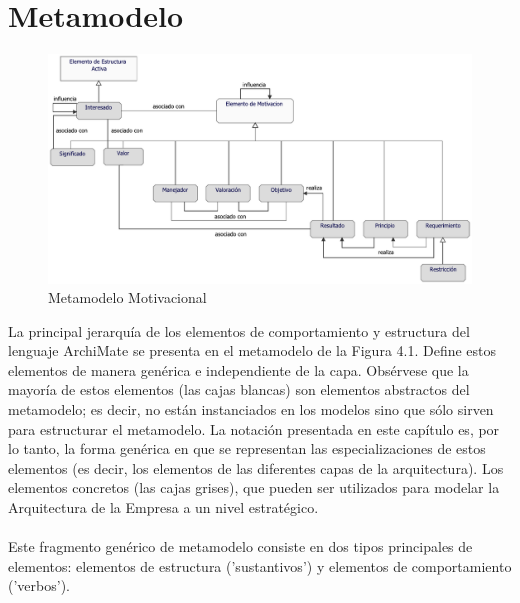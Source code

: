 \section{Metamodelo}
\begin{figure}[h!]
	\centering
	\includegraphics[width=1.0\linewidth]{imgs/meta/Motivacion}
	\caption{Metamodelo Motivacional}
\end{figure}

La principal jerarquía de los elementos de comportamiento y estructura del lenguaje ArchiMate se presenta en el metamodelo de la Figura 4.1. Define estos elementos de manera genérica e independiente de la capa. Obsérvese que la mayoría de estos elementos (las cajas blancas) son elementos abstractos del metamodelo; es decir, no están instanciados en los modelos sino que sólo sirven para estructurar el metamodelo.  La notación presentada en este capítulo es, por lo tanto, la forma genérica en que se representan las especializaciones de estos elementos (es decir, los elementos de las diferentes capas de la arquitectura).  Los elementos concretos (las cajas grises), que pueden ser utilizados para modelar la Arquitectura de la Empresa a un nivel estratégico.\\ \\

Este fragmento genérico de metamodelo consiste en dos tipos principales de elementos: elementos de estructura ('sustantivos') y elementos de comportamiento ('verbos').

\newpage








